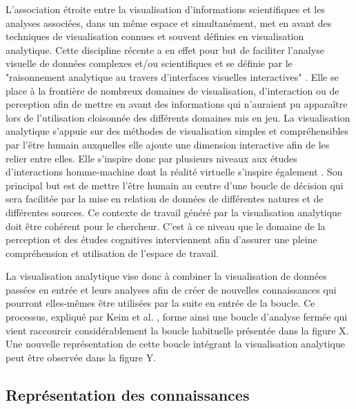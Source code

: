 L'association étroite entre la visualisation d'informations scientifiques et les analyses associées, dans un même espace et simultanément, met en avant des techniques de visualisation connues et souvent définies en visualisation analytique. Cette discipline récente a en effet pour but de faciliter l'analyse visuelle de données complexes et/ou scientifiques et se définie par le "raisonnement analytique au travers d'interfaces visuelles interactives" \cite{cook_illuminating_2005}. Elle se place à la frontière de nombreux domaines de visualisation, d'interaction ou de perception afin de mettre en avant des informations qui n'auraient pu apparaître lors de l'utilisation cloisonnée des différents domaines mis en jeu. La visualisation analytique s'appuie sur des méthodes de visualisation simples et compréhensibles par l'être humain auxquelles elle ajoute une dimension interactive afin de les relier entre elles. Elle s'inspire donc par plusieurs niveaux aux études d'interactions homme-machine dont la réalité virtuelle s'inspire également \cite{arias-hernandez_visual_2011}. Son principal but est de mettre l'être humain au centre d'une boucle de décision qui sera facilitée par la mise en relation de données de différentes natures et de différentes sources. Ce contexte de travail généré par la visualisation analytique doit être cohérent pour le chercheur. C'est à ce niveau que le domaine de la perception et des études cognitives interviennent afin d'assurer une pleine compréhension et utilisation de l'espace de travail.

La visualisation analytique vise donc à combiner la visualisation de données passées en entrée et leurs analyses afin de créer de nouvelles connaissances qui pourront elles-mêmes être utilisées par la suite en entrée de la boucle. Ce processus, expliqué par Keim et al. \cite{keim2010mastering}, forme ainsi une boucle d'analyse fermée qui vient raccourcir considérablement la boucle habituelle présentée dans la figure X. Une nouvelle représentation de cette boucle intégrant la visualisation analytique peut être observée dans la figure Y.

\subsection{Représentation des connaissances}

